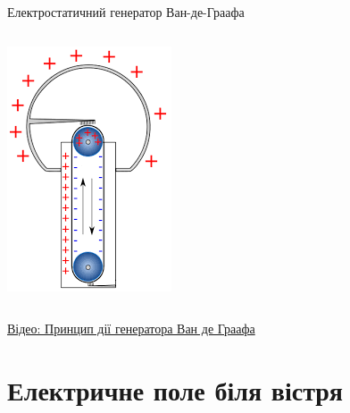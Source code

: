\documentclass{beamer}
\begin{document}
\begin{frame}{Електростатичний генератор Ван-де-Граафа}{}
\begin{columns}
\begin{column}{0.3\linewidth}
			\includegraphics[width=\linewidth]{VanDeGraaf}
		\end{column}
	\end{columns}
	\begin{block}{}
		\href{https://www.youtube.com/watch?v=Xqt2gAalV4Y}{Відео: Принцип дії генератора Ван де
			Граафа}
	\end{block}
\end{frame}



\section{Електричне поле біля вістря}
\end{document}
